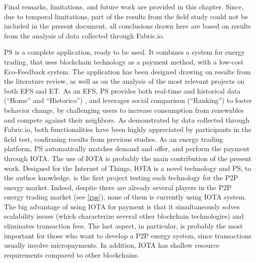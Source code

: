 \cleardoublepage
\label{chap:conclusions}

Final remarks, limitations, and future work are provided in this chapter. Since, due to temporal limitations, part of the results from the field study could not be included in the present document, all conclusions drawn here are based on results from the analysis of data collected through Fabric.io. 
	
	
	
\ac{PS} is a complete application, ready to be used. It combines a system for energy trading, that uses blockchain technology as a payment method, with a low-cost Eco-Feedback system. The application has been designed drawing on results from the literature review, as well as on the analysis of the most relevant projects on both \ac{EFS} and \ac{ET}.
As an \ac{EFS}, \ac{PS} provides both real-time and historical data (“Home” and “Historico”) \cite{Giulio2009}, and leverages social comparison (“Ranking”) \cite{Froehlich2010} to foster behavior change, by challenging users to increase consumption from renewables and compete against their neighbors. As demonstrated by data collected through Fabric.io, both functionalities have been highly appreciated by participants in the field test, confirming results from previous studies.
As an energy trading platform, \ac{PS} automatically matches demand and offer, and perform the payment through IOTA. The use of IOTA is probably the main contribution of the present work. Designed for the Internet of Things, IOTA is a novel technology and \ac{PS}, to the author knowledge, is the first project testing such technology for the P2P energy market. Indeed, despite there are already several players in the P2P energy trading market (see \cref{rps}), none of them is currently using IOTA system. The big advantage of using IOTA for payment is that it simultaneously solves scalability issues (which characterize several other blockchain technologies) and eliminates transaction fees. The last aspect, in particular, is probably the most important for those who want to develop a P2P energy system, since transactions usually involve micropayments. In addition, IOTA has shallow resource requirements compared to other blockchains. 



